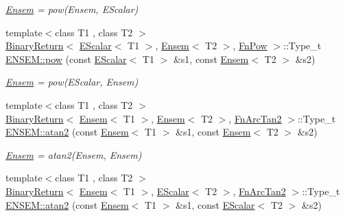 \begin{DoxyCompactItemize}
\begin{DoxyCompactList}\small\item\em \mbox{\hyperlink{classENSEM_1_1Ensem}{Ensem}} = pow(\+Ensem, E\+Scalar) \end{DoxyCompactList}\item 
{\footnotesize template$<$class T1 , class T2 $>$ }\\\mbox{\hyperlink{structENSEM_1_1BinaryReturn}{Binary\+Return}}$<$ \mbox{\hyperlink{classENSEM_1_1EScalar}{E\+Scalar}}$<$ T1 $>$, \mbox{\hyperlink{classENSEM_1_1Ensem}{Ensem}}$<$ T2 $>$, \mbox{\hyperlink{structENSEM_1_1FnPow}{Fn\+Pow}} $>$\+::Type\+\_\+t \mbox{\hyperlink{group__eensem_gae3b272ae394d114d478f320d24ca05df}{E\+N\+S\+E\+M\+::pow}} (const \mbox{\hyperlink{classENSEM_1_1EScalar}{E\+Scalar}}$<$ T1 $>$ \&s1, const \mbox{\hyperlink{classENSEM_1_1Ensem}{Ensem}}$<$ T2 $>$ \&s2)
\begin{DoxyCompactList}\small\item\em \mbox{\hyperlink{classENSEM_1_1Ensem}{Ensem}} = pow(\+E\+Scalar, Ensem) \end{DoxyCompactList}\item 
{\footnotesize template$<$class T1 , class T2 $>$ }\\\mbox{\hyperlink{structENSEM_1_1BinaryReturn}{Binary\+Return}}$<$ \mbox{\hyperlink{classENSEM_1_1Ensem}{Ensem}}$<$ T1 $>$, \mbox{\hyperlink{classENSEM_1_1Ensem}{Ensem}}$<$ T2 $>$, \mbox{\hyperlink{structENSEM_1_1FnArcTan2}{Fn\+Arc\+Tan2}} $>$\+::Type\+\_\+t \mbox{\hyperlink{group__eensem_ga4a9f9b7400c5d7cbbb6f6118ca6a3c47}{E\+N\+S\+E\+M\+::atan2}} (const \mbox{\hyperlink{classENSEM_1_1Ensem}{Ensem}}$<$ T1 $>$ \&s1, const \mbox{\hyperlink{classENSEM_1_1Ensem}{Ensem}}$<$ T2 $>$ \&s2)
\begin{DoxyCompactList}\small\item\em \mbox{\hyperlink{classENSEM_1_1Ensem}{Ensem}} = atan2(\+Ensem, Ensem) \end{DoxyCompactList}\item 
{\footnotesize template$<$class T1 , class T2 $>$ }\\\mbox{\hyperlink{structENSEM_1_1BinaryReturn}{Binary\+Return}}$<$ \mbox{\hyperlink{classENSEM_1_1Ensem}{Ensem}}$<$ T1 $>$, \mbox{\hyperlink{classENSEM_1_1EScalar}{E\+Scalar}}$<$ T2 $>$, \mbox{\hyperlink{structENSEM_1_1FnArcTan2}{Fn\+Arc\+Tan2}} $>$\+::Type\+\_\+t \mbox{\hyperlink{group__eensem_gabe797638db840fa2cddca1e1d133fc55}{E\+N\+S\+E\+M\+::atan2}} (const \mbox{\hyperlink{classENSEM_1_1Ensem}{Ensem}}$<$ T1 $>$ \&s1, const \mbox{\hyperlink{classENSEM_1_1EScalar}{E\+Scalar}}$<$ T2 $>$ \&s2)

\end{DoxyCompactItemize}
